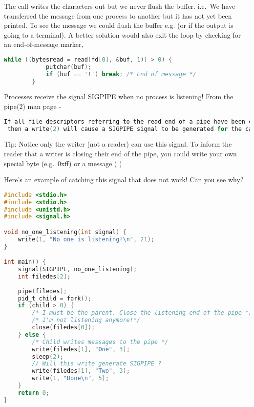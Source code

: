 The call  writes the characters out but we never flush the  buffer. i.e.~We have transferred the message from one process to another but it has not yet been printed. To see the message we could flush the buffer e.g.  (or  if the output is going to a terminal). A better solution would also exit the loop by checking for an end-of-message marker,

\begin{lstlisting}[language=C]
        while ((bytesread = read(fd[0], &buf, 1)) > 0) {
            putchar(buf);
            if (buf == '!') break; /* End of message */
        }
\end{lstlisting}

Processes receive the signal SIGPIPE when no process is listening! From
the pipe(2) man page -

\begin{lstlisting}[language=C]
If all file descriptors referring to the read end of a pipe have been closed,
 then a write(2) will cause a SIGPIPE signal to be generated for the calling process. 
\end{lstlisting}

Tip: Notice only the writer (not a reader) can use this signal. To
inform the reader that a writer is closing their end of the pipe, you
could write your own special byte (e.g.~0xff) or a message (
)

Here's an example of catching this signal that does not work! Can you
see why?

\begin{lstlisting}[language=C]
#include <stdio.h>
#include <stdio.h>
#include <unistd.h>
#include <signal.h>

void no_one_listening(int signal) {
    write(1, "No one is listening!\n", 21);
}

int main() {
    signal(SIGPIPE, no_one_listening);
    int filedes[2];
    
    pipe(filedes);
    pid_t child = fork();
    if (child > 0) { 
        /* I must be the parent. Close the listening end of the pipe */
        /* I'm not listening anymore!*/
        close(filedes[0]);
    } else {
        /* Child writes messages to the pipe */
        write(filedes[1], "One", 3);
        sleep(2);
        // Will this write generate SIGPIPE ?
        write(filedes[1], "Two", 3);
        write(1, "Done\n", 5);
    }
    return 0;
}
\end{lstlisting}

